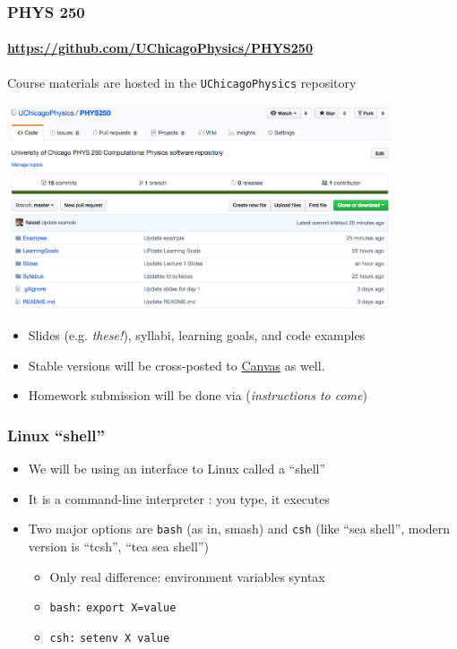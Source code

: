 \documentclass[hyperref={colorlinks=true}]{beamer}
\begin{document}
\begin{frame}%
  \frametitle{PHYS 250 \github}
  \framesubtitle{\url{https://github.com/UChicagoPhysics/PHYS250}}
  
  Course materials are hosted in the \github \texttt{UChicagoPhysics} repository
  
  \begin{center}
    \includegraphics[width=0.85\textwidth]{../Lecture1/PHYS250-GitHub.png}
  \end{center}

  \vspace{-0.5cm}

  \begin{itemize}
    \item Slides (e.g. \textit{these!}), syllabi, learning goals, and code examples
    \item Stable versions will be cross-posted to \href{\CanvasURL}{Canvas} as well.
    \item Homework submission will be done via \github (\textit{instructions to come})
  \end{itemize}
  
  
\end{frame}


\begin{frame}%
  \frametitle{Linux ``shell''}
  
  \begin{itemize}
    \item We will be using an interface to Linux called a ``shell''
    \item It is a command-line interpreter : you type, it executes
    \item Two major options are \texttt{bash} (as in, smash) and \texttt{csh} (like ``sea shell'', modern version is ``tcsh'', ``tea sea shell'')
    \begin{itemize}
      \item Only real difference: environment variables syntax
      \item \texttt{bash:} \texttt{export X=value}
      \item \texttt{csh:} \texttt{setenv X value}
    \end{itemize}
  \end{itemize}
  
\end{frame}
\end{document}

